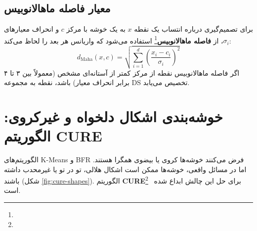 \subsection{معیار فاصله ماهالانوبیس \texorpdfstring{}{(Mahalanobis Distance)}}
برای تصمیم‌گیری درباره انتساب یک نقطه $x$ به یک خوشه با مرکز $c$ و انحراف معیارهای $\sigma_i$، از \textbf{فاصله ماهالانوبیس}\footnote{} استفاده می‌شود که واریانس هر بعد را لحاظ می‌کند:
\begin{equation}
d_{\text{Maha}}(x, c) = \sqrt{\sum_{i=1}^d \left( \frac{x_i - c_i}{\sigma_i} \right)^2}
\end{equation}
اگر فاصله ماهالانوبیس نقطه از مرکز کمتر از آستانه‌ای مشخص (معمولاً بین ۳ تا ۴ برابر انحراف معیار) باشد، نقطه به مجموعه DS تخصیص می‌یابد.

\section{خوشه‌بندی اشکال دلخواه و غیرکروی: الگوریتم CURE}
الگوریتم‌های K-Means و BFR فرض می‌کنند خوشه‌ها کروی یا بیضوی همگرا هستند. اما در مسائل واقعی، خوشه‌ها ممکن است اشکال هلالی، تو در تو یا غیرمحدب داشته باشند (شکل \ref{fig:cure-shapes}).
الگوریتم \textbf{CURE}\footnote{}~\cite{guha1998cure} برای حل این چالش ابداع شده است.

